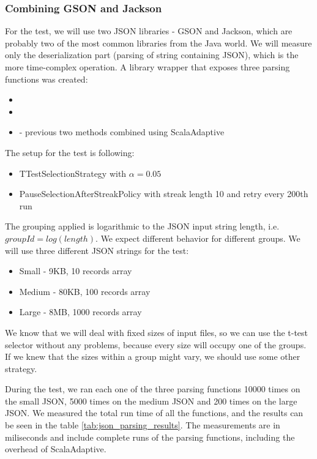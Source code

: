 \subsubsection{Combining GSON and Jackson}

For the test, we will use two JSON libraries - GSON and Jackson, which are probably two of the most common libraries from the Java world. We will measure only the deserialization part (parsing of string containing JSON), which is the more time-complex operation. A library wrapper that exposes three parsing functions was created:
\begin{itemize}
	\item {}
	\item {}
	\item {} - previous two methods combined using ScalaAdaptive
\end{itemize}

The setup for the test is following:
\begin{itemize}
	\item TTestSelectionStrategy with $\alpha = 0.05$
	\item PauseSelectionAfterStreakPolicy with streak length 10 and retry every 200th run
\end{itemize}

The grouping applied is logarithmic to the JSON input string length, i.e. $groupId = log(length)$. We expect different behavior for different groups. We will use three different JSON strings for the test:

\begin{itemize}
	\item Small - 9KB, 10 records array
	\item Medium - 80KB, 100 records array
	\item Large - 8MB, 1000 records array
\end{itemize}

We know that we will deal with fixed sizes of input files, so we can use the t-test selector without any problems, because every size will occupy one of the groups. If we knew that the sizes within a group might vary, we should use some other strategy.

During the test, we ran each one of the three parsing functions 10000 times on the small JSON, 5000 times on the medium JSON and 200 times on the large JSON. We measured the total run time of all the functions, and the results can be seen in the table \ref{tab:json_parsing_results}. The measurements are in miliseconds and include complete runs of the parsing functions, including the overhead of ScalaAdaptive.

